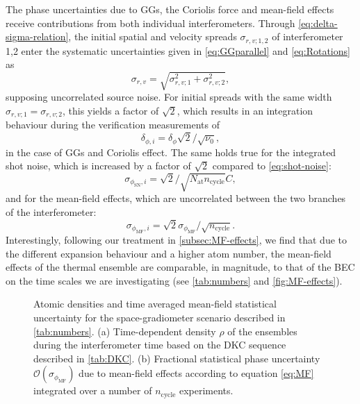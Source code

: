 The phase uncertainties due to GGs, the Coriolis force and mean-field effects receive contributions from both individual interferometers. Through \autoref{eq:delta-sigma-relation}, the initial spatial and velocity spreads $\sigma_{r,v;1,2}$ of interferometer 1,2 enter the systematic uncertainties given in \autoref{eq:GGparallel} and \autoref{eq:Rotations} as 
\begin{equation}
    \label{eq:mean-square-spreads}
    \sigma_{r,v}=\sqrt{\sigma_{r,v;1}^2+\sigma_{r,v;2}^2},
\end{equation}
supposing uncorrelated source noise. For initial spreads with the same width $\sigma_{r,v;1}=\sigma_{r,v;2}$, this yields a factor of $\sqrt{2}$, which results in an integration behaviour during the verification measurements of
\begin{equation}
    \delta_{\phi,i}=\delta_{\phi}\sqrt{2}/\sqrt{\nu_0},
\end{equation}
in the case of GGs and Coriolis effect.
The same holds true for the integrated shot noise, which is increased by a factor of $\sqrt{2}$ compared to \autoref{eq:shot-noise}:
\begin{equation}
    \sigma_{\phi_\text{SN},i}=\sqrt{2}/\sqrt{N_\text{at} n_\text{cycle}}C,
\end{equation}
and for the mean-field effects, which are uncorrelated between the two branches of the interferometer:
\begin{equation}
    \sigma_{\phi_\text{MF},i}=\sqrt{2}\sigma_{\phi_\text{MF}}/\sqrt{n_\text{cycle}}.
\end{equation}
Interestingly, following our treatment in \autoref{subsec:MF-effects}, we find that due to the different expansion behaviour and a higher atom number, the mean-field effects of the thermal ensemble are comparable, in magnitude, to that of the BEC on the time scales we are investigating (see \autoref{tab:numbers} and \autoref{fig:MF-effects}).

\begin{figure}[h!]
    \centering
    \caption{Atomic densities and time averaged mean-field statistical uncertainty for the space-gradiometer scenario described in \autoref{tab:numbers}. (a) Time-dependent density $\rho$ of the ensembles during the interferometer time based on the DKC sequence described in \autoref{tab:DKC}. (b) Fractional statistical phase uncertainty $\mathcal{O}(\sigma_{\phi_\text{MF}})$ due to mean-field effects according to equation \autoref{eq:MF} integrated over a number of $n_\text{cycle}$ experiments. }
    \label{fig:MF-effects}
\end{figure}

